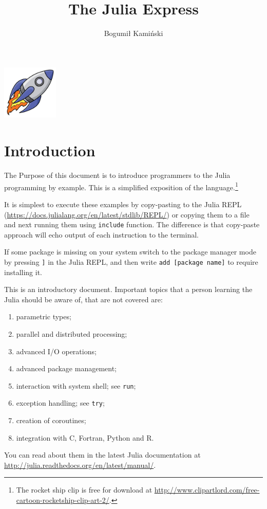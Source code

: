 \documentclass[10pt,a4paper]{article}
\begin{document}
\title{The Julia Express}
\author{Bogumił Kamiński}
\maketitle

{\centering
\includegraphics[width=0.2\textwidth]{rocketship11.png}\par
}

\tableofcontents

\section{Introduction}
The Purpose of this document is to introduce programmers to the Julia programming by example.
This is a simplified exposition of the language.\footnote{The rocket ship clip is free for download at \url{http://www.clipartlord.com/free-cartoon-rocketship-clip-art-2/}.}

It is simplest to execute these examples by copy-pasting to the Julia REPL (\url{https://docs.julialang.org/en/latest/stdlib/REPL/}) or copying them to a file and next running them using \lstinline|include| function. The difference is that copy-paste approach will echo output of each instruction to the terminal.

If some package is missing on your system switch to the package manager mode by pressing \lstinline|]| in the Julia REPL, and then write \lstinline|add [package name]| to require installing it.

This is an introductory document. Important topics that a person learning the Julia should be aware of, that are not covered are:
\begin{enumerate}[label=\arabic*),nolistsep]
  \item parametric types;
  \item parallel and distributed processing;
  \item advanced I/O operations;
  \item advanced package management;
  \item interaction with system shell; see \lstinline|run|;
  \item exception handling; see \lstinline|try|;
  \item creation of coroutines;
  \item integration with C, Fortran, Python and R.
\end{enumerate}
You can read about them in the latest Julia documentation at \url{http://julia.readthedocs.org/en/latest/manual/}.
\end{document}
